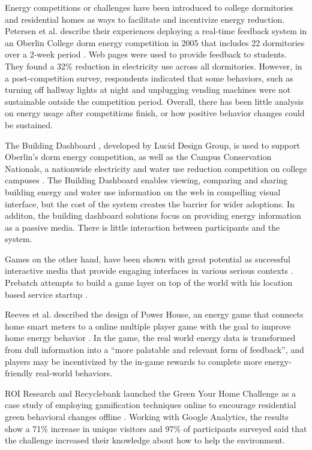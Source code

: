 \documentclass{acm_proc_article-sp}
\begin{document}
Energy competitions or challenges have been introduced to college dormitories
and residential homes as ways to facilitate and incentivize energy reduction.
Petersen et al. describe their experiences deploying a real-time feedback
system in an Oberlin College dorm energy competition in 2005 that includes 22
dormitories over a 2-week period \cite{petersen-dorm-energy-reduction}. Web
pages were used to provide feedback to students. They found a 32\% reduction in
electricity use across all dormitories. However, in a post-competition survey,
respondents indicated that some behaviors, such as turning off hallway lights
at night and unplugging vending machines were not sustainable outside the
competition period.  Overall, there has been little analysis on energy usage
after competitions finish, or how positive behavior changes could be sustained.

The Building Dashboard \cite{building-dashboard}, developed by Lucid Design 
Group, is used to support Oberlin's dorm energy competition,
as well as the Campus Conservation Nationals, a nationwide electricity and 
water use reduction competition on college campuses \cite{competetoreduce}. 
The Building Dashboard enables viewing, comparing and sharing building energy
and water use information on the web in compelling visual interface, but the 
cost of the system creates the barrier for wider adoptions. In additon, the 
building dashboard solutions focus on providing energy information as 
a passive media. There is little interaction between participants and the system.

Games on the other hand, have been shown with great potential as successful
interactive media that provide engaging interfaces in various serious 
contexts \cite{mcgonigal2011reality,reeves2009total}. Prebatch attempts to build
a game layer on top of the world with his location based service startup
 \cite{Priebatsch2010ted}. 

Reeves et al. described the design of Power House, an energy game that connects
home smart meters to a online multiple player game with the goal to improve
home energy behavior \cite{Reeves2011powerhouse}. In the game, the real world
energy data is transformed from dull information into a ``more palatable and
relevant form of feedback'', and players may be incentivized by the in-game
rewards to complete more energy-friendly real-world behaviors.

ROI Research and Recyclebank launched the Green Your Home Challenge as a case 
study of employing gamification techniques online to 
encourage residential green behavioral changes offline \cite{gamingforgood}. 
Working with Google Analytics, the results show a 71\% increase in unique 
visitors and 97\% of participants surveyed said that the challenge increased 
their knowledge about how to help the environment. 
\end{document}
